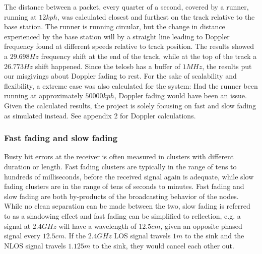 \noindent The distance between a packet, every quarter of a second, covered by a runner, running at $12kph$, was calculated closest and furthest on the track relative to the base station. The runner is running circular, but the change in distance experienced by the base station will by a straight line leading to Doppler frequency found at different speeds relative to track position. The results showed a $29.698Hz$ frequency shift at the end of the track, while at the top of the track a $26.773Hz$ shift happened. Since the telosb has a buffer of $1MHz$, the results put our misgivings about Doppler fading to rest. For the sake of scalability and flexibility, a extreme case was also calculated for the system: Had the runner been running at approximately $50000kph$, Doppler fading would have been an issue. Given the calculated results, the project is solely focusing on fast and slow fading as simulated instead. See appendix 2 for Doppler calculations.

\subsubsection{Fast fading and slow fading}

Busty bit errors at the receiver is often measured in clusters with different duration or length. Fast fading clusters are typically in the range of tens to hundreds of milliseconds, before the received signal again is adequate, while slow fading clusters are in the range of tens of seconds to minutes. Fast fading and slow fading are both by-products of the broadcasting behavior of the nodes. While no clean separation can be made between the two, slow fading is referred to as a shadowing effect and fast fading can be simplified to reflection, e.g. a signal at $2.4GHz$ will have a wavelength of $12.5cm$, given an opposite phased signal every $12.5cm$. If the $2.4GHz$ LOS signal travels $1m$ to the sink and the NLOS signal travels $1.125m$ to the sink, they would cancel each other out.

